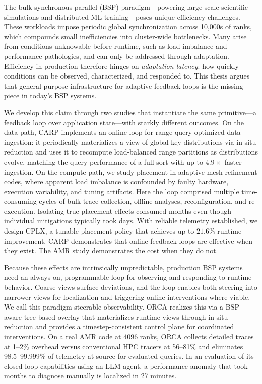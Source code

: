 

The bulk-synchronous parallel (BSP) paradigm---powering large-scale scientific simulations and
distributed ML training---poses unique efficiency challenges.
These workloads impose periodic global synchronization across 10,000s of ranks, which compounds
small inefficiencies into cluster-wide bottlenecks.
Many arise from conditions unknowable before runtime, such as load imbalance and performance
pathologies, and can only be addressed through adaptation.
Efficiency in production therefore hinges on \emph{adaptation latency}: how quickly conditions can
be observed, characterized, and responded to.
This thesis argues that general-purpose infrastructure
for adaptive feedback loops
is the missing piece in today's BSP systems.

We develop this claim through two studies that instantiate the same primitive---a feedback loop
over application state---with starkly different outcomes.
On the data path, CARP implements an online loop for range-query-optimized data ingestion: it
periodically materializes a view of global key distributions via in-situ reduction and uses it to
recompute load-balanced range partitions as distributions evolve, matching the query performance of
a full sort with up to $4.9\times$ faster ingestion.
On the compute path, we study placement in adaptive mesh refinement codes, where apparent load
imbalance is confounded by faulty hardware, execution variability, and tuning artifacts.
Here the loop comprised multiple time-consuming cycles of
bulk trace collection, offline analyses, reconfiguration, and re-execution.
Isolating true placement effects consumed months even though individual mitigations typically took
days.
With reliable telemetry established, we design CPLX, a tunable placement policy that achieves up
to $21.6\%$ runtime improvement.
CARP demonstrates that online feedback loops are effective when they exist.
The AMR study demonstrates the cost when they do not.

Because these effects are intrinsically unpredictable, production BSP systems need an always-on,
programmable loop for observing and responding to runtime behavior.
Coarse views surface deviations, and the loop enables both steering into narrower views for
localization and triggering online interventions where viable.
We call this paradigm steerable observability.
ORCA realizes this via a BSP-aware tree-based overlay that
materializes runtime views through in-situ reduction and provides a timestep-consistent control
plane for coordinated interventions.
On a real AMR code at 4096 ranks, ORCA collects detailed traces at 1--2\% overhead versus
conventional HPC tracers at 56--81\% and eliminates 98.5--99.999\% of telemetry at source for
evaluated queries.
In an evaluation of its closed-loop capabilities using an LLM agent, a performance anomaly that
took months to diagnose manually is localized in 27 minutes.


